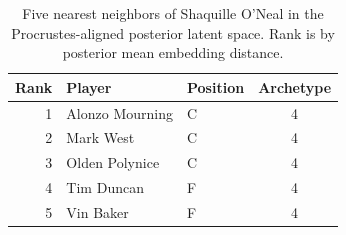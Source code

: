 \begin{table}[htbp]
  \centering\small
  \begin{tabular}{rllc}
    \toprule
    Rank & Player & Position & Archetype \\
    \midrule
    1 & Alonzo Mourning & C & 4 \\
    2 & Mark West & C & 4 \\
    3 & Olden Polynice & C & 4 \\
    4 & Tim Duncan & F & 4 \\
    5 & Vin Baker & F & 4 \\
    \bottomrule
  \end{tabular}
  \caption{Five nearest neighbors of Shaquille O'Neal in the Procrustes-aligned posterior latent space. Rank is by posterior mean embedding distance.}
  \label{tab:Shaquille_O_Neal_neighbors}
\end{table}

